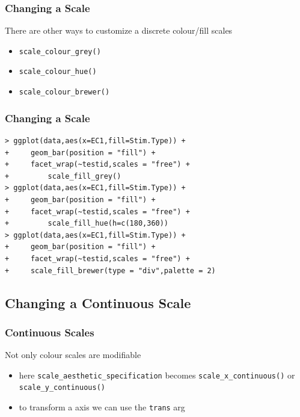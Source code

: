 \documentclass[xcolor={table},c]{beamer}
\begin{document}
\begin{frame}[fragile]\frametitle{Changing a Scale}
There are other ways to customize a discrete colour/fill scales
  \begin{itemize}
  \item \texttt{scale\_colour\_grey()}
  \item \texttt{scale\_colour\_hue()}
  \item \texttt{scale\_colour\_brewer()}
  \end{itemize}
\end{frame}

\begin{frame}[fragile]\frametitle{Changing a Scale}
\begin{verbatim}
> ggplot(data,aes(x=EC1,fill=Stim.Type)) +
+     geom_bar(position = "fill") +
+     facet_wrap(~testid,scales = "free") +
+         scale_fill_grey()
> ggplot(data,aes(x=EC1,fill=Stim.Type)) +
+     geom_bar(position = "fill") +
+     facet_wrap(~testid,scales = "free") +
+         scale_fill_hue(h=c(180,360))
> ggplot(data,aes(x=EC1,fill=Stim.Type)) +
+     geom_bar(position = "fill") +
+     facet_wrap(~testid,scales = "free") +
+     scale_fill_brewer(type = "div",palette = 2)
\end{verbatim}
\end{frame}

\subsection{Changing a Continuous Scale}
\begin{frame}[fragile]\frametitle{Continuous Scales}
Not only colour scales are modifiable
\begin{itemize}
\item here \texttt{scale\_aesthetic\_specification} becomes  \texttt{scale\_x\_continuous()} or  \texttt{scale\_y\_continuous()}
\item to transform a axis we can use the \texttt{trans} arg
\end{itemize}
\end{frame}
\end{document}
